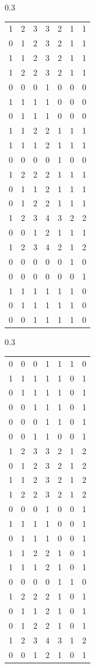\documentclass{amsart}
\theoremstyle{definition}
\theoremstyle{remark}
\numberwithin{equation}{section}
\begin{document}
\begin{table}[H]
\begin{subtable}{0.3\textwidth}
\centering
\begin{tabular}{lllllll}
1 & 2 & 3 & 3 & 2 & 1 & 1 \\
0 & 1 & 2 & 3 & 2 & 1 & 1 \\
1 & 1 & 2 & 3 & 2 & 1 & 1 \\
1 & 2 & 2 & 3 & 2 & 1 & 1 \\
0 & 0 & 0 & 1 & 0 & 0 & 0 \\
1 & 1 & 1 & 1 & 0 & 0 & 0 \\
0 & 1 & 1 & 1 & 0 & 0 & 0 \\
1 & 1 & 2 & 2 & 1 & 1 & 1 \\
1 & 1 & 1 & 2 & 1 & 1 & 1 \\
0 & 0 & 0 & 0 & 1 & 0 & 0 \\
1 & 2 & 2 & 2 & 1 & 1 & 1 \\
0 & 1 & 1 & 2 & 1 & 1 & 1 \\
0 & 1 & 2 & 2 & 1 & 1 & 1 \\
1 & 2 & 3 & 4 & 3 & 2 & 2 \\
0 & 0 & 1 & 2 & 1 & 1 & 1 \\
1 & 2 & 3 & 4 & 2 & 1 & 2 \\
0 & 0 & 0 & 0 & 0 & 1 & 0 \\
0 & 0 & 0 & 0 & 0 & 0 & 1 \\
1 & 1 & 1 & 1 & 1 & 1 & 0 \\
0 & 1 & 1 & 1 & 1 & 1 & 0 \\
0 & 0 & 1 & 1 & 1 & 1 & 0
\end{tabular}
\end{subtable}
\centering
\begin{subtable}{0.3\textwidth}
\centering
\begin{tabular}{lllllll}
0 & 0 & 0 & 1 & 1 & 1 & 0 \\
1 & 1 & 1 & 1 & 1 & 0 & 1 \\
0 & 1 & 1 & 1 & 1 & 0 & 1 \\
0 & 0 & 1 & 1 & 1 & 0 & 1 \\
0 & 0 & 0 & 1 & 1 & 0 & 1 \\
0 & 0 & 1 & 1 & 0 & 0 & 1 \\
1 & 2 & 3 & 3 & 2 & 1 & 2 \\
0 & 1 & 2 & 3 & 2 & 1 & 2 \\
1 & 1 & 2 & 3 & 2 & 1 & 2 \\
1 & 2 & 2 & 3 & 2 & 1 & 2 \\
0 & 0 & 0 & 1 & 0 & 0 & 1 \\
1 & 1 & 1 & 1 & 0 & 0 & 1 \\
0 & 1 & 1 & 1 & 0 & 0 & 1 \\
1 & 1 & 2 & 2 & 1 & 0 & 1 \\
1 & 1 & 1 & 2 & 1 & 0 & 1 \\
0 & 0 & 0 & 0 & 1 & 1 & 0 \\
1 & 2 & 2 & 2 & 1 & 0 & 1 \\
0 & 1 & 1 & 2 & 1 & 0 & 1 \\
0 & 1 & 2 & 2 & 1 & 0 & 1 \\
1 & 2 & 3 & 4 & 3 & 1 & 2 \\
0 & 0 & 1 & 2 & 1 & 0 & 1
\end{tabular}
\end{subtable}
\end{table}
\end{document}

